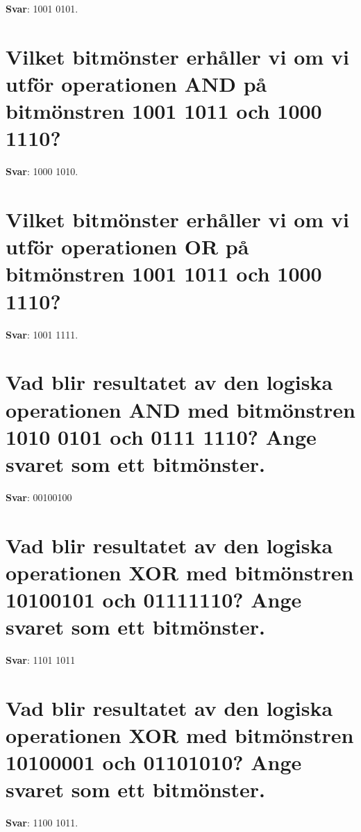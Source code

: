 \documentclass[a4paper,11pt,oneside]{book}
\begin{document}
\begin{sloppypar}
\label{q:406:sa:sv:True}

\textbf{Svar}: 1001 0101.



\section{Vilket bitm\"onster erh\r{a}ller vi om vi utf\"or operationen AND p\r{a} bitm\"onstren 1001 1011 och 1000 1110?}

\label{q:407:sa:sv:True}

\textbf{Svar}: 1000 1010.



\section{Vilket bitm\"onster erh\r{a}ller vi om vi utf\"or operationen OR p\r{a} bitm\"onstren 1001 1011 och 1000 1110?}

\label{q:408:sa:sv:True}

\textbf{Svar}: 1001 1111.



\section{Vad blir resultatet av den logiska operationen AND med bitm\"onstren 1010 0101 och 0111 1110? Ange svaret som ett bitm\"onster.}

\label{q:409:sa:sv:True}

\textbf{Svar}: 00100100



\section{Vad blir resultatet av den logiska operationen XOR med bitm\"onstren 10100101 och 01111110? Ange svaret som ett bitm\"onster.}

\label{q:410:sa:sv:True}

\textbf{Svar}: 1101 1011



\section{Vad blir resultatet av den logiska operationen XOR med bitm\"onstren 10100001 och 01101010? Ange svaret som ett bitm\"onster.}

\label{q:411:sa:sv:True}

\textbf{Svar}: 1100 1011.




\end{sloppypar}
\end{document}
